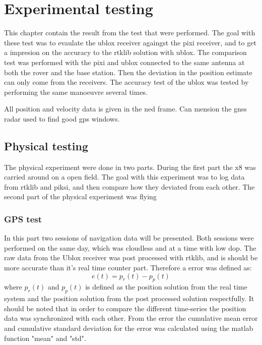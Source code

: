 
\chapter{Experimental testing}
This chapter contain the result from the test that were performed. The goal with these test was to evaulate the ublox receiver againgst the pixi receiver, and to get a impresion on the accuracy to the rtklib solution with ublox. The comparison test was performed with the pixi and ublox connected to the same antenna at both the rover and the base station. Then the deviation in the position estimate can only come from the receivers. The accuracy test of the ublox was tested by performing the same manoeuvre several times.

All position and velocity data is given in the \gls{ned} frame. 
Can mension the gnss radar used to find good gps windows.
\section{Physical testing}
The physical experiment were done in two parts. During the first part the x8 was carried around on a open field. The goal with this experiment was to log data from rtklib and piksi, and then compare how they deviated from each other. The second part of the physical experiment was flying 

\subsection{GPS test}
In this part two sessions of navigation data will be presented. Both sessions were performed on the same day, which was cloudless and at a time with low \gls{dop}. The raw data from the Ublox receiver was post processed with rtklib, and is should be more accurate than it's real time counter part. Therefore a error was defined as:
\begin{equation}
e(t) = p_r(t) - p_p(t)
\end{equation}
where $p_r(t)$ and $p_p(t)$ is defined as the position solution from the real time system and the position solution from the post processed solution respectfully. It should be noted that in order to compare the different time-series the position data was synchronized with each other. From the error the cumulative mean error and cumulative standard deviation for the error was calculated using the matlab function "mean" and "std".
